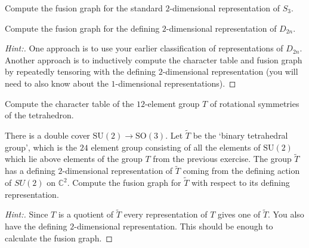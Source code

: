 \documentclass[11pt]{article}
\begin{document}
\begin{exercise}
Compute the fusion graph for the standard $2$-dimensional representation of $S_3$.
\end{exercise}

\begin{exercise}
Compute the fusion graph for the defining $2$-dimensional representation of $D_{2n}$.
\end{exercise}
\begin{proof}[Hint:]
One approach is to use your earlier classification of representations of $D_{2n}$.  Another approach is to inductively compute the character table and fusion graph by repeatedly tensoring with the defining $2$-dimensional representation (you will need to also know about the $1$-dimensional representations).
\end{proof}

\begin{exercise}
Compute the character table of the $12$-element group $T$ of rotational symmetries of the tetrahedron.
\end{exercise}

\begin{exercise}
There is a double cover $\mathrm{SU}(2) \rightarrow \mathrm{SO}(3)$.  Let $\tilde{T}$ be the `binary tetrahedral group', which is the $24$ element group consisting of all the elements of $\mathrm{SU}(2)$ which lie above elements of the group $T$ from the previous exercise.  The group $\tilde{T}$ has a  defining $2$-dimensional representation of $\tilde{T}$ coming from the defining action of $SU(2)$ on $\mathbb{C}^2$.  Compute the fusion graph for $\tilde{T}$ with respect to its defining representation.
\end{exercise}
\begin{proof}[Hint:]
Since $T$ is a quotient of $\tilde{T}$ every representation of $T$ gives one of $\tilde{T}$.  You also have the defining $2$-dimensional representation.  This should be enough to calculate the fusion graph.
\end{proof}
\end{document}
